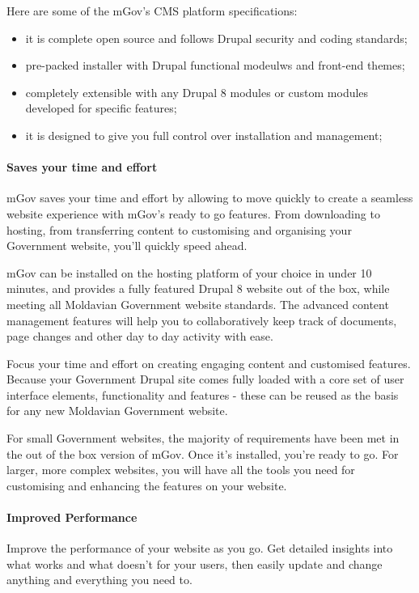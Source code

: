 Here are some of the mGov’s CMS platform specifications:

\begin{itemize}
	\item it is complete open source and follows Drupal security and coding standards;
	\item pre-packed installer with Drupal functional modeulws and front-end themes;
	\item completely extensible with any Drupal 8 modules or custom modules developed for specific features;
	\item it is designed to give you full control over installation and management;
\end{itemize}

\paragraph{Saves your time and effort}

mGov saves your time and effort by allowing to move quickly to create a seamless website experience with mGov’s ready to go features. From downloading to hosting, from transferring content to customising and organising your Government website, you’ll quickly speed ahead.

mGov can be installed on the hosting platform of your choice in under 10 minutes, and provides a fully featured Drupal 8 website out of the box, while meeting all Moldavian Government website standards. The advanced content management features will help you to collaboratively keep track of documents, page changes and other day to day activity with ease.

Focus your time and effort on creating engaging content and customised features. Because your Government Drupal site comes fully loaded with a core set of user interface elements, functionality and features - these can be reused as the basis for any new Moldavian Government website.

For small Government websites, the majority of requirements have been met in the out of the box version of mGov. Once it's installed, you're ready to go. For larger, more complex websites, you will have all the tools you need for customising and enhancing the features on your website.

\paragraph{Improved Performance}

Improve the performance of your website as you go. Get detailed insights into what works and what doesn’t for your users, then easily update and change anything and everything you need to.

